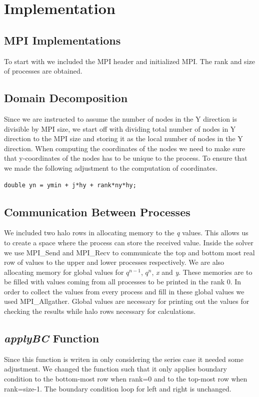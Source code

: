 \documentclass{report}
\begin{document}
\chapter{Implementation}
\section{MPI Implementations}
To start with we included the MPI header and initialized MPI. The rank and size of processes are obtained.
\section{Domain Decomposition}
Since we are instructed to assume the number of nodes in the Y direction is divisible by MPI size, we start off with dividing total number of nodes in Y direction to the MPI size and storing it as the local number of nodes in the Y direction.
When computing the coordinates of the nodes we need to make sure that y-coordinates of the nodes has to be unique to the process. To ensure that we made the following adjustment to the computation of coordinates.
\begin{verbatim}
double yn = ymin + j*hy + rank*ny*hy;
\end{verbatim}

\section{Communication Between Processes}
We included two halo rows in allocating memory to the \emph{q} values. This allows us to create a space where the process can store the received value. Inside the solver we use MPI\_Send and MPI\_Recv to communicate the top and bottom most real row of values to the upper and lower processes respectively. We are also allocating memory for global values for $q^{n-1}$, $q^{n}$, \emph{x} and \emph{y}. These memories are to be filled with values coming from all processes to be printed in the rank 0. In order to collect the values from every process and fill in these global values we used MPI\_Allgather. Global values are necessary for printing out the values for checking the results while halo rows necessary for calculations.

\section{\emph{applyBC} Function}
Since this function is writen in only considering the series case it needed some adjustment. We changed the function such that it only applies boundary condition to the bottom-most row when rank=0 and to the top-most row when rank=size-1. The boundary condition loop for left and right is unchanged.
\end{document}
